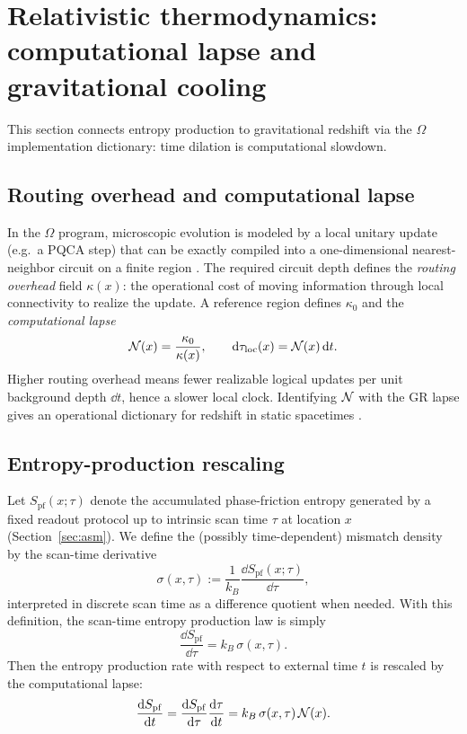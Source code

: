 \section{Relativistic thermodynamics: computational lapse and gravitational cooling}
\label{sec:lapse_thermo}

This section connects entropy production to gravitational redshift via the $\Omega$ implementation dictionary: time dilation is computational slowdown.

\subsection{Routing overhead and computational lapse}

In the $\Omega$ program, microscopic evolution is modeled by a local unitary update (e.g.\ a PQCA step) that can be exactly compiled into a one-dimensional nearest-neighbor circuit on a finite region \cite{Ma2025FoP,Ma2025CAP}. The required circuit depth defines the \emph{routing overhead} field $\kappa(x)$: the operational cost of moving information through local connectivity to realize the update. A reference region defines $\kappa_0$ and the \emph{computational lapse}
\begin{equation}
\mathcal{N}(x)=\frac{\kappa_0}{\kappa(x)},\qquad \mathrm{d} \tau_{\mathrm{loc}}(x)=\mathcal{N}(x)\,\mathrm{d} t.
\end{equation}
Higher routing overhead means fewer realizable logical updates per unit background depth $\dd t$, hence a slower local clock. Identifying $\mathcal{N}$ with the GR lapse gives an operational dictionary for redshift in static spacetimes \cite{Wald1984,Carroll2004,MisnerThorneWheeler1973}.

\subsection{Entropy-production rescaling}

Let $S_{\mathrm{pf}}(x;\tau)$ denote the accumulated phase-friction entropy generated by a fixed readout protocol up to intrinsic scan time $\tau$ at location $x$ (Section~\ref{sec:asm}). We define the (possibly time-dependent) mismatch density by the scan-time derivative
\begin{equation}
  \sigma(x,\tau) := \frac{1}{k_B}\frac{\dd S_{\mathrm{pf}}(x;\tau)}{\dd \tau},
\end{equation}
interpreted in discrete scan time as a difference quotient when needed. With this definition, the scan-time entropy production law is simply
\begin{equation}
\frac{\dd S_{\mathrm{pf}}}{\dd \tau}=k_B\,\sigma(x,\tau).
\end{equation}
Then the entropy production rate with respect to external time $t$ is rescaled by the computational lapse:
\begin{equation}
\frac{\mathrm{d} S_{\mathrm{pf}}}{\mathrm{d} t} = \frac{\mathrm{d} S_{\mathrm{pf}}}{\mathrm{d} \tau}\frac{\mathrm{d} \tau}{\mathrm{d} t}
  = k_B\,\sigma(x,\tau)\,\mathcal{N}(x).
\label{eq:lapse_rescaling}
\end{equation}

